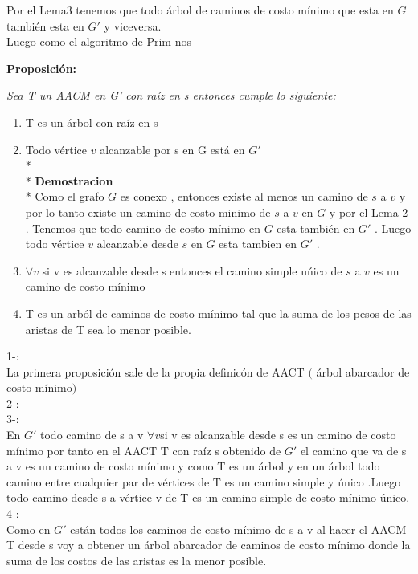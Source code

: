 \documentclass{article}
\begin{document}
    \vspace*{0.3cm} 

    \noindent  Por el Lema3 tenemos que todo \'arbol de caminos de costo m\'inimo que esta en $G$ tambi\'en esta en $G'$  y viceversa.\\
    Luego como el algoritmo de Prim nos
    
    \vspace*{0.5cm}
    \noindent \textbf{Proposici\'on:}
    
    \noindent \textit{Sea T un  AACM en G' con ra\'iz en s entonces cumple lo siguiente:}

    \begin{enumerate}
        \item T es un \'arbol con ra\'iz en s
        \item Todo v\'ertice $v$ alcanzable por s en G est\'a en $G'$
        \\*
        \\*
        \textbf{Demostracion } 
        \\*
        Como el grafo $G$ es conexo , entonces existe al menos un camino de $s$ a $v$ y por lo tanto existe un camino de costo minimo 
        de $s$ a $v$ en $G$ y por el Lema 2 . Tenemos que todo camino de costo m\'inimo en $G$ esta tambi\'en en $G'$ . Luego todo v\'ertice 
        $v$ alcanzable desde $s$ en $G$ esta tambien en $G'$ . 
        
        \vspace*{0.3cm} 

        \item $\forall v$ si v es alcanzable desde s entonces el camino simple u\'nico de $s$ a $v$ es un camino de costo m\'inimo
        \item T es un arb\'ol de caminos de costo mı\'inimo tal que la suma de los pesos de las aristas de T sea lo menor posible.
    \end{enumerate}
    
    1-:\\
    La primera proposici\'on sale de la propia definic\'on de AACT $($ \'arbol abarcador de costo m\'inimo$)$\\
    2-:\\
    3-:\\
    En $G'$ todo camino  de s a v $\forall v$si v es alcanzable desde s es un camino de costo m\'inimo por tanto en el AACT T con ra\'iz s obtenido
    de $G'$ el camino que va de s a v es un camino de costo m\'inimo y como T es un \'arbol y en un \'arbol todo camino entre cualquier 
    par de v\'ertices de T es un camino simple y \'unico .Luego todo camino desde s a v\'ertice v de T es un camino simple de costo m\'inimo 
    \'unico.\\
    4-:\\
    Como en $G'$ est\'an todos los caminos de costo m\'inimo de s a v  al hacer el AACM T desde s voy a obtener un \'arbol abarcador de
    caminos de costo m\'inimo donde la suma de los costos de las aristas es la menor posible.\\
    
\end{document}
